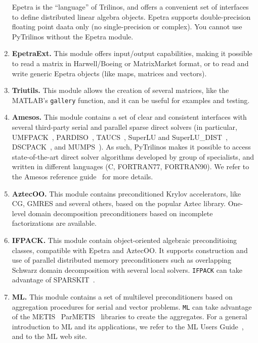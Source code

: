 \documentclass[10pt,relax]{SANDreport}
\begin{document}
\begin{enumerate}
Epetra is the
``language'' of Trilinos, and offers a convenient set of interfaces to define
distributed linear algebra objects. Epetra supports double-precision floating
point daata only (no single-precision or complex). 
You cannot use PyTrilinos without the Epetra module.
%
\item {\bf EpetraExt.} This module offers input/output
capabilities, making it possible to read a matrix in Harwell/Boeing or
MatrixMarket format, or to read and write generic Epetra objects 
(like maps, matrices and vectors).
%
\item {\bf Triutils.} This module allows the creation of several matrices, 
  like the MATLAB's {\tt gallery} function, and it can be useful for examples
  and testing.
%
\item {\bf Amesos.} This module contains a set of clear and consistent
interfaces with several third-party serial and parallel sparse direct solvers
(in particular,
UMFPACK~\cite{umfpack-manual},
PARDISO~\cite{pardiso-manual},
TAUCS~\cite{taucs-manual},
SuperLU and SuperLU\_DIST~\cite{superlu-manual},
DSCPACK~\cite{dscpack-manual}, and 
MUMPS~\cite{mumps-manual}). As such, PyTrilinos makes it possible to access
state-of-the-art direct solver algorithms developed by group of specialists,
  and written in different languages (C, FORTRAN77, FORTRAN90).
We refer to the Amesos reference guide~\cite{Amesos-Reference-Guide} for more details.
%
\item {\bf AztecOO.} This module contains preconditioned Krylov accelerators,
  like CG, GMRES and several others, based on the popular Aztec library.
  One-level domain decomposition preconditioners based on incomplete
  factorizations are available.
%
\item {\bf IFPACK.} This module contain object-oriented algebraic preconditioing
classes, compatible with Epetra and AztecOO.
It supports construction and use of parallel distributed memory preconditioners
such as overlapping Schwarz domain decomposition with several local solvers.
{\tt IFPACK} can take advantage of SPARSKIT~\cite{sparskit}.
%
\item {\bf ML.} This module contains a set of multilevel preconditioners based
on aggregation procedures for serial and vector problems. {\tt ML} can take
advantage of the 
METIS~\cite{metis}
ParMETIS~\cite{parmetis} libraries to create the aggregates.
For a general introduction to ML and its applications, we refer to
the ML Users Guide~\cite{ml-guide}, and to the ML web site.
\end{enumerate}
\end{document}
